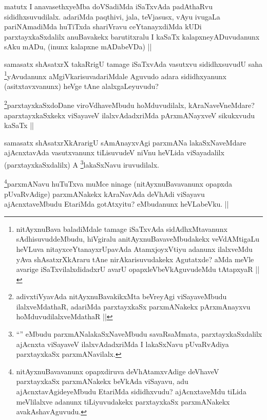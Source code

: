 \begin{artha}
matutx I anavasethxyeMba doVSadiMda iSaTxvAda padAthaRvu sididhxsuvudilalx. adariMda paqthivi, jala, teVjasusx, vAyu ivugaLa pariNAmadiMda huTiTxda shariVravu ceYtanayxdiMda kUDi parxtayxkaSxdalilx anuBavakekx barutitxralu I kaSaTx kalapxneyADuvudanunx sAku mADu, (inunx kalapxne mADabeVDa) ||
\end{artha}

\begin{artha}
samasatx shAsatxrX takaRrigU tamage iSaTxvAda vasutxvu sididhxsuvudU saha \footnote{nitAyxnuBava baladiMdale tamage iSaTxvAda sidAdhxMtavanunx sAdhisuvuddeMbudu, hiVgiralu anitAyxnuBavaveMbudakekx veVdAMtigaLu heVLuva nitayxceYtanayxrUpavAda AtamxjoyxVtiyu adanunx ilalxveMdu yAva shAsatxrXkAraru tAne nirAkarisuvudakekx Agutatxde? aMda meVle avarige iSaTxvilalxdidadxrU avarU opapxleVbeVkAguvudeMdu tAtapxyaR ||}yAvudanunx aMgiVkarisuvadariMdale Aguvudo adara sididhxyanunx (asitxtavxvanunx) heVge tAne alalxgaLeyuvudu? 
\end{artha}

\begin{artha}
\footnote{adivxtiVyavAda nitAyxnuBavakikxMta beVreyAgi viSayaveMbudu ilalxveMdathaR, adariMda parxtayxkaSx parxmANakekx pArxmAnayxvu hoMduvudilalxveMdathaR ||}parxtayxkaSxdoDane viroVdhaveMbudu hoMduvudilalx, kAraNaveVneMdare? aparxtayxkaSxkekx viSayaveV ilalxvAdadxriMda pArxmANayxveV sikukxvudu kaSaTx ||
\end{artha}

\begin{artha}
samasatx shAsatxrXkArarigU sAmAnayxvAgi parxmANa lakaSxNaveMdare ajAcnxtavAda vasutxvanunx tiLisuvudeV niVnu heVLida viSayadalilx (parxtayxkaSxdalilx) A \footnote{``\stext'' eMbudu parxmANalakaSxNaveMbudu savaRsaMmata, parxtayxkaSxdalilx ajAcnxta viSayaveV ilalxvAdadxriMda I lakaSxNavu pUvaRvAdiya parxtayxkaSx parxmANavilalx.}lakaSxNavu iruvudilalx.
\end{artha}

\begin{artha}
\footnote{nitAyxnuBavavanunx opapxdiruva deVhAtamxvAdige deVhaveV parxtayxkaSx parxmANakekx beVkAda viSayavu, adu ajAcnxtavAgideyeMbudu EtariMda sididhxvudu? ajAcnxtaveMdu tiLida meVlilalxve adanunx tiLiyuvudakekx parxtayxkaSx parxmANakekx avakAshavAguvudu.}parxmANavu huTuTxva muMce ninage (nitAyxnuBavavanunx opapxda pUvaRvAdige) parxmANakekx kAraNavAda deVhAdi viSayavu ajAcnxtaveMbudu EtariMda gotAtxyitu? eMbudanunx heVLabeVku. ||
\end{artha}


